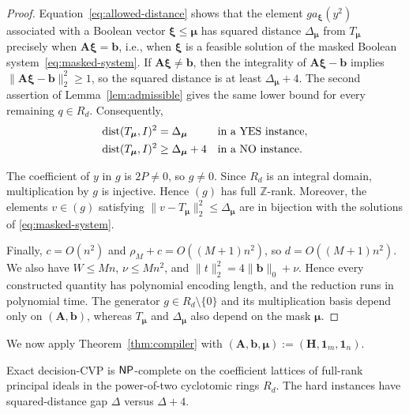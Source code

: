 \begin{proof}
Equation~\eqref{eq:allowed-distance} shows that the element
\(g a_{\boldsymbol\xi}(y^2)\) associated with a Boolean vector
\(\boldsymbol\xi\leq\boldsymbol\mu\) has squared distance
\(\Delta_{\boldsymbol\mu}\) from \(T_{\boldsymbol\mu}\)
precisely when
\(\mathbf A\boldsymbol\xi=\mathbf b\), i.e., when \(\boldsymbol\xi\) is a
feasible solution of the masked Boolean system~\eqref{eq:masked-system}.
If \(\mathbf A\boldsymbol\xi\neq\mathbf b\), then the integrality of
\(\mathbf A\boldsymbol\xi-\mathbf b\) implies
\(\|\mathbf A\boldsymbol\xi-\mathbf b\|_2^2\geq1\), so the squared distance
is at least \(\Delta_{\boldsymbol\mu}+4\).
The second assertion
of Lemma~\ref{lem:admissible} gives the same lower bound for
every remaining \(q\in R_d\).  Consequently,
\[
\begin{aligned}
 {\operatorname{dist}(T_{\boldsymbol\mu},I)^2}
 &=\Delta_{\boldsymbol\mu} &&\text{in a YES instance},\\
 {\operatorname{dist}(T_{\boldsymbol\mu},I)^2}
 &\geq\Delta_{\boldsymbol\mu}+4 &&\text{in a NO instance}.
\end{aligned}
\]

The coefficient of \(y\) in \(g\) is \(2P\neq0\), so \(g\neq0\).
Since \(R_d\) is an integral domain, multiplication by \(g\) is injective.
Hence \((g)\) has full \(\mathbb Z\)-rank.  Moreover, the elements \(v\in(g)\)
satisfying \(\|v-T_{\boldsymbol\mu}\|_2^2\leq\Delta_{\boldsymbol\mu}\) are in
bijection with the solutions of \eqref{eq:masked-system}.

Finally, \(c=O(n^2)\) and
\(\rho_M+c=O((M+1)n^2)\), so \(d=O((M+1)n^2)\).  We also have
\(W\leq Mn\), \(\nu\leq Mn^2\), and
\(\|t\|_2^2=4\|\mathbf b\|_0+\nu\).  Hence every constructed quantity has
polynomial encoding length, and the reduction runs in polynomial time.
The generator \(g\in R_d\setminus\{0\}\) and its
multiplication basis depend only on
\((\mathbf A,\mathbf b)\), whereas \(T_{\boldsymbol\mu}\) and
\(\Delta_{\boldsymbol\mu}\) also depend on the mask \(\boldsymbol\mu\).
\end{proof}

We now apply Theorem~\ref{thm:compiler} with
\((\mathbf A,\mathbf b,\boldsymbol\mu)
  \mathrel{:=}(\mathbf H,\mathbf 1_m,\mathbf 1_n)\).

\begin{theorem}
\label{thm:cyclotomic-cvp}
Exact decision-CVP is \(\mathsf{NP}\)-complete on the coefficient lattices of
full-rank principal ideals in the power-of-two cyclotomic rings \(R_d\).
The hard instances have squared-distance gap \(\Delta\) versus
\(\Delta+4\).
\end{theorem}


